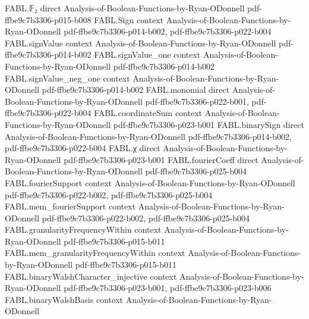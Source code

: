 \begin{theorem}
\leanok
{}
\proofstep
  {FABL.𝔽₂}
  {direct}
  {Analysis-of-Boolean-Functions-by-Ryan-ODonnell}
  {pdf-ffbe9c7b3306-p015-b008}
\proofstep
  {FABL.Sign}
  {context}
  {Analysis-of-Boolean-Functions-by-Ryan-ODonnell}
  {pdf-ffbe9c7b3306-p014-b002,
    pdf-ffbe9c7b3306-p022-b004}
\proofstep
  {FABL.signValue}
  {context}
  {Analysis-of-Boolean-Functions-by-Ryan-ODonnell}
  {pdf-ffbe9c7b3306-p014-b002}
\proofstep
  {FABL.signValue_one}
  {context}
  {Analysis-of-Boolean-Functions-by-Ryan-ODonnell}
  {pdf-ffbe9c7b3306-p014-b002}
\proofstep
  {FABL.signValue_neg_one}
  {context}
  {Analysis-of-Boolean-Functions-by-Ryan-ODonnell}
  {pdf-ffbe9c7b3306-p014-b002}
\proofstep
  {FABL.monomial}
  {direct}
  {Analysis-of-Boolean-Functions-by-Ryan-ODonnell}
  {pdf-ffbe9c7b3306-p022-b001,
    pdf-ffbe9c7b3306-p022-b004}
\proofstep
  {FABL.coordinateSum}
  {context}
  {Analysis-of-Boolean-Functions-by-Ryan-ODonnell}
  {pdf-ffbe9c7b3306-p023-b001}
\proofstep
  {FABL.binarySign}
  {direct}
  {Analysis-of-Boolean-Functions-by-Ryan-ODonnell}
  {pdf-ffbe9c7b3306-p014-b002,
    pdf-ffbe9c7b3306-p022-b004}
\proofstep
  {FABL.χ}
  {direct}
  {Analysis-of-Boolean-Functions-by-Ryan-ODonnell}
  {pdf-ffbe9c7b3306-p023-b001}
\proofstep
  {FABL.fourierCoeff}
  {direct}
  {Analysis-of-Boolean-Functions-by-Ryan-ODonnell}
  {pdf-ffbe9c7b3306-p025-b004}
\proofstep
  {FABL.fourierSupport}
  {context}
  {Analysis-of-Boolean-Functions-by-Ryan-ODonnell}
  {pdf-ffbe9c7b3306-p022-b002,
    pdf-ffbe9c7b3306-p025-b004}
\proofstep
  {FABL.mem_fourierSupport}
  {context}
  {Analysis-of-Boolean-Functions-by-Ryan-ODonnell}
  {pdf-ffbe9c7b3306-p022-b002,
    pdf-ffbe9c7b3306-p025-b004}
\proofstep
  {FABL.granularityFrequencyWithin}
  {context}
  {Analysis-of-Boolean-Functions-by-Ryan-ODonnell}
  {pdf-ffbe9c7b3306-p015-b011}
\proofstep
  {FABL.mem_granularityFrequencyWithin}
  {context}
  {Analysis-of-Boolean-Functions-by-Ryan-ODonnell}
  {pdf-ffbe9c7b3306-p015-b011}
\proofstep
  {FABL.binaryWalshCharacter_injective}
  {context}
  {Analysis-of-Boolean-Functions-by-Ryan-ODonnell}
  {pdf-ffbe9c7b3306-p023-b001,
    pdf-ffbe9c7b3306-p023-b006}
\proofstep
  {FABL.binaryWalshBasis}
  {context}
  {Analysis-of-Boolean-Functions-by-Ryan-ODonnell}

\end{theorem}
